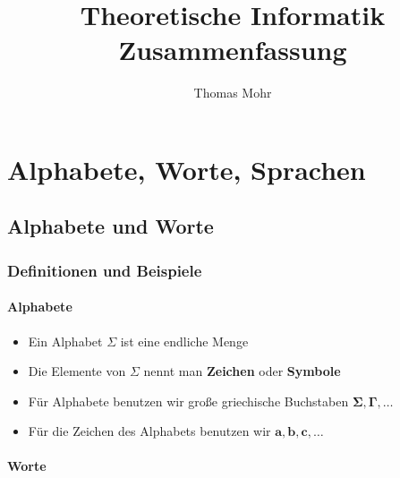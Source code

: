 \documentclass{scrartcl}
\title{Theoretische Informatik \\ Zusammenfassung}
\author{Thomas Mohr}
\date{}
\begin{document}
\maketitle
\pagebreak

\section{Alphabete, Worte, Sprachen}

\subsection{Alphabete und Worte}

\subsubsection{Definitionen und Beispiele}

\paragraph{Alphabete}

\begin{itemize}
	\item Ein Alphabet $\Sigma$ ist eine endliche Menge
	\item Die Elemente von $\Sigma$ nennt man \textbf{Zeichen} oder \textbf{Symbole}
	\item Für Alphabete benutzen wir große griechische Buchstaben $\mathbf{\Sigma,\Gamma,\ldots}$
	\item Für die Zeichen des Alphabets benutzen wir $\mathbf{a,b,c,\ldots}$
\end{itemize}

\paragraph{Worte}
\end{document}
